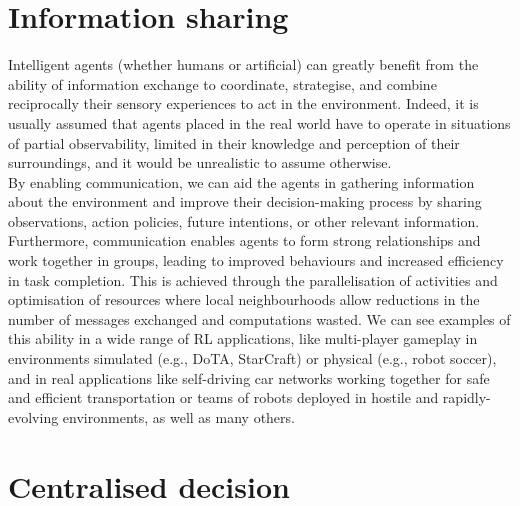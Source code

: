 \documentclass[a4paper,singleside,12pt]{report} %
\begin{document}
\section{Information sharing}\label{information-sharing}

Intelligent agents (whether humans or artificial) can greatly benefit from the ability of information exchange to coordinate, strategise, and combine reciprocally their sensory experiences to act in the environment. Indeed, it is usually assumed that agents placed in the real world have to operate in situations of partial observability, limited in their knowledge and perception of their surroundings, and it would be unrealistic to assume otherwise.\\
By enabling communication, we can aid the agents in gathering information about the environment and improve their decision-making process by sharing observations, action policies, future intentions, or other relevant information. Furthermore, communication enables agents to form strong relationships and work together in groups, leading to improved behaviours and increased efficiency in task completion. This is achieved through the parallelisation of activities and optimisation of resources where local neighbourhoods allow reductions in the number of messages exchanged and computations wasted. We can see examples of this ability in a wide range of RL applications, like multi-player gameplay in environments simulated (e.g., DoTA, StarCraft) or physical (e.g., robot soccer), and in real applications like self-driving car networks working together for safe and efficient transportation or teams of robots deployed in hostile and rapidly-evolving environments, as well as many others.

\section{Centralised decision}\label{centralised-decision}
\end{document}

